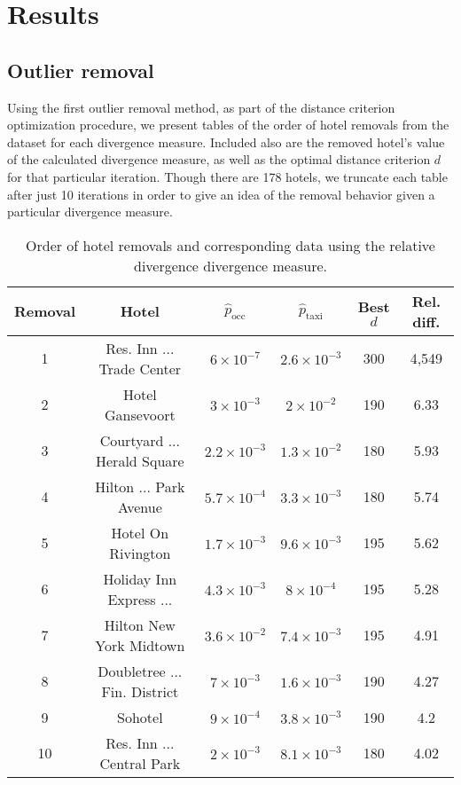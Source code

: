 \documentclass[useAMS, referee, usenatbib]{biom}
\begin{document}
\section{Results}
\label{s:results}

\subsection{Outlier removal}

Using the first outlier removal method, as part of the distance criterion optimization procedure, we present tables of the order of hotel removals from the dataset for each divergence measure. Included also are the removed hotel's value of the calculated divergence measure, as well as the optimal distance criterion $d$ for that particular iteration. Though there are 178 hotels, we truncate each table after just 10 iterations in order to give an idea of the removal behavior given a particular divergence measure.

\begin{table}
\caption{Order of hotel removals and corresponding data using the relative divergence divergence measure.}
\label{t:relative_divergence}
\begin{center}
 \begin{tabular}{||c|c|c|c|c|c||}
 \hline
 Removal & Hotel & $\hat{p}_{\mathrm{occ}}$ & $\hat{p}_{\mathrm{taxi}}$ & Best $d$ & Rel. diff. \\ [0.5ex] 
 \hline
 1 & Res. Inn ... Trade Center & $6 \times 10^{-7}$ & $2.6 \times 10^{-3}$ & 300 & 4,549 \\
 2 & Hotel Gansevoort & $3 \times 10^{-3}$ & $2 \times 10^{-2}$ & 190 & 6.33 \\
 3 & Courtyard ... Herald Square & $2.2 \times 10^{-3}$ & $1.3 \times 10^{-2}$ & 180 & 5.93 \\
 4 & Hilton ... Park Avenue & $5.7 \times 10^{-4}$ & $3.3 \times 10^{-3}$ & 180 & 5.74 \\
 5 & Hotel On Rivington & $1.7 \times 10^{-3}$ & $9.6 \times 10^{-3}$ & 195 & 5.62 \\
 6 & Holiday Inn Express ... & $4.3 \times 10^{-3}$ & $8 \times 10^{-4}$ & 195 & 5.28 \\
 7 & Hilton New York Midtown & $3.6 \times 10^{-2}$ & $7.4 \times 10^{-3}$ & 195 & 4.91 \\
 8 & Doubletree ... Fin. District & $7 \times 10^{-3}$ & $1.6 \times 10^{-3}$ & 190 & 4.27 \\
 9 & Sohotel & $9 \times 10^{-4}$ & $3.8 \times 10^{-3}$ & 190 & 4.2 \\
 10 & Res. Inn ... Central Park & $2 \times 10^{-3}$ & $8.1 \times 10^{-3}$ & 180 & 4.02 \\
 \hline
\end{tabular}
\end{center}
\end{table}
\end{document}
